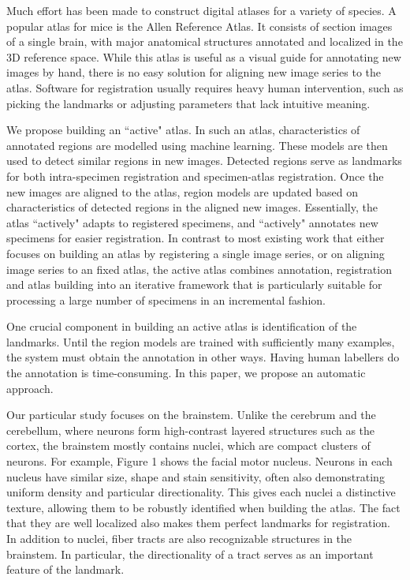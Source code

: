 \documentclass{llncs}
\begin{document}
Much effort has been made to construct digital atlases for a variety of species. A popular atlas for mice is the Allen Reference Atlas. It consists of section images of a single brain, with major anatomical structures annotated and localized in the 3D reference space. While this atlas is useful as a visual guide for annotating new images by hand, there is no easy solution for aligning new image series to the atlas. Software for registration usually requires heavy human intervention, such as picking the landmarks or adjusting parameters that lack intuitive meaning.

We propose building an ``active" atlas. In such an atlas, characteristics of annotated regions are modelled using machine learning. These models are then used to detect similar regions in new images. Detected regions serve as landmarks for both intra-specimen registration and specimen-atlas registration. Once the new images are aligned to the atlas, region models are updated based on characteristics of detected regions in the aligned new images. Essentially, the atlas ``actively" adapts to registered specimens, and ``actively" annotates new specimens for easier registration. In contrast to most existing work that either focuses on building an atlas by registering a single image series, or on aligning image series to an fixed atlas, the active atlas combines annotation, registration and atlas building into an iterative framework that is particularly suitable for processing a large number of specimens in an incremental fashion.


One crucial component in building an active atlas is identification of the landmarks. Until the region models are trained with sufficiently many examples, the system must obtain the annotation in other ways. Having human labellers do the annotation is time-consuming. In this paper, we propose an automatic approach.

Our particular study focuses on the brainstem. Unlike the cerebrum and the cerebellum, where neurons form high-contrast layered structures such as the cortex, the brainstem mostly contains nuclei, which are compact clusters of neurons. For example, Figure 1 shows the facial motor nucleus. Neurons in each nucleus have similar size, shape and stain sensitivity, often also demonstrating uniform density and particular directionality. This gives each nuclei a distinctive texture, allowing them to be robustly identified when building the atlas. The fact that they are well localized also makes them perfect landmarks for registration. In addition to nuclei, fiber tracts are also recognizable structures in the brainstem. In particular, the directionality of a tract serves as an important feature of the landmark.
\end{document}
